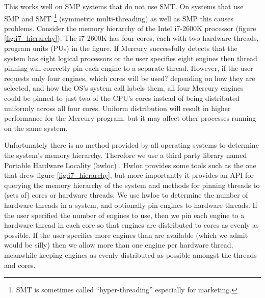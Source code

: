 This works well on SMP systems that do not use SMT.
On systems that use SMP and SMT
\footnote{
    SMT is sometimes called ``hyper-threading'' especially for marketing.}
(symmetric multi-threading) as well as SMP this causes problems.
Consider the memory hierarchy of the Intel i7-2600K processor
(figure \ref{fig:i7_hierarchy}).
The i7-2600K has four cores, each with two hardware threads,
program units (PUs) in the figure.
If Mercury successfully detects that the system has eight logical processors
or the user specifies eight engines then thread pinning will correctly pin
each engine to a separate thread.
However,
if the user requests only four engines, which cores will be used?
depending on how they are selected,
and how the OS's  system call labels them,
all four Mercury engines could be pinned to just two of the CPU's cores
instead of being distributed uniformly across all four cores.
Uniform distribution will result in higher performance for the Mercury
program,
but it may affect other processes running on the same system.

Unfortunately there is no method provided by all operating systems to
determine the system's memory hierarchy.
Therefore we use a third party library
named Portable Hardware Locality (hwloc) \citep{broquedis:2010:hwloc}.
Hwloc provides some tools such as the one that drew figure
\ref{fig:i7_hierarchy},
but more importantly it provides an API for querying the memory hierarchy of
the system and methods for pinning threads to (sets of) cores or hardware
threads.
We use hwloc to determine the number of hardware threads in a system,
and optionally pin engines to hardware threads.
If the user specified the number of engines to use,
then we pin each engine to a hardware thread in each core so that engines
are distributed to cores as evenly as possible.
If the user specifies more engines than are available
(which we admit would be silly) then we allow more than one engine per
hardware thread,
meanwhile keeping engines as evenly distributed as possible amongst the
threads and cores.



